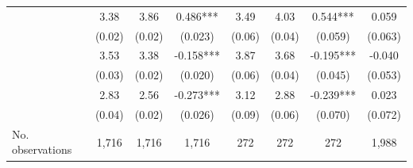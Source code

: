 \begin{ThreePartTable}
{\begin{longtable}[c]{p{3cm}S@{}S@{}S[round-precision=3]S@{}S@{}S[round-precision=3]S[round-precision=3]}
            &        3.38&        3.86&       0.486***&        3.49&        4.03&       0.544***&       0.059   \\
                                          &      (0.02)&      (0.02)&     (0.023)   &      (0.06)&      (0.04)&     (0.059)   &     (0.063)   \\
            &        3.53&        3.38&      -0.158***&        3.87&        3.68&      -0.195***&      -0.040   \\
                                          &      (0.03)&      (0.02)&     (0.020)   &      (0.06)&      (0.04)&     (0.045)   &     (0.053)   \\
            &        2.83&        2.56&      -0.273***&        3.12&        2.88&      -0.239***&       0.023   \\
                                          &      (0.04)&      (0.02)&     (0.026)   &      (0.09)&      (0.06)&     (0.070)   &     (0.072)   \\
            \midrule
            No. observations              &       1,716&       1,716&       1,716   &         272&         272&         272   &       1,988   \\
    \end{longtable}}
\end{ThreePartTable}
